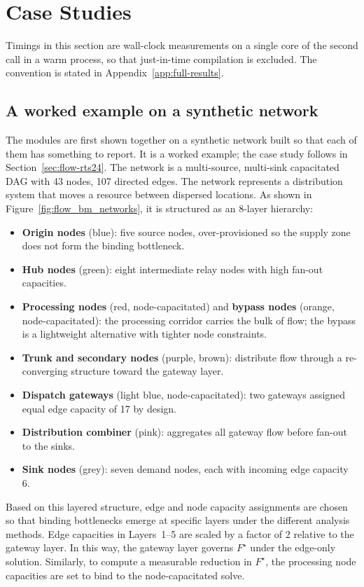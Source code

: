 \documentclass[12pt]{report}
\begin{document}
\section{Case Studies}
\label{sec:flow-cases}

Timings in this section are wall-clock measurements on a single core of the second call in a
warm process, so that just-in-time compilation is excluded. The convention is stated in
Appendix~\ref{app:full-results}.

\subsection{A worked example on a synthetic network}
\label{sec:flow-worked}
The modules are first shown together on a synthetic network built so that each of them has something to report. It is a worked example; the case study follows in Section~\ref{sec:flow-rts24}. The network is a multi-source, multi-sink capacitated DAG with 43 nodes, 107 directed edges. The network represents a distribution system that moves a resource between dispersed locations. As shown in Figure~\ref{fig:flow_bm_networks}, it is structured as an 8-layer hierarchy:

\begin{itemize}
    \item \textbf{Origin nodes} (blue): five source nodes, over-provisioned so the supply zone does not form the binding bottleneck.
    \item \textbf{Hub nodes} (green): eight intermediate relay nodes with high fan-out capacities.
    \item \textbf{Processing nodes} (red, node-capacitated) and \textbf{bypass nodes} (orange, node-capacitated): the processing corridor carries the bulk of flow; the bypass is a lightweight alternative with tighter node constraints.
    \item \textbf{Trunk and secondary nodes} (purple, brown): distribute flow through a re-converging structure toward the gateway layer.
    \item \textbf{Dispatch gateways} (light blue, node-capacitated): two gateways assigned equal edge capacity of 17 by design.
    \item \textbf{Distribution combiner} (pink): aggregates all gateway flow before fan-out to the sinks.
    \item \textbf{Sink nodes} (grey): seven demand nodes, each with incoming edge capacity 6.
\end{itemize}
Based on this layered structure, edge and node capacity assignments are chosen so that binding bottlenecks emerge at specific layers under the different analysis methods. Edge capacities in Layers~1--5 are scaled by a factor of 2 relative to the gateway layer. In this way, the gateway layer governs $F^\star$ under the edge-only solution. Similarly, to compute a measurable reduction in $F^\star$, the processing node capacities are set to bind to the node-capacitated solve.
\end{document}
